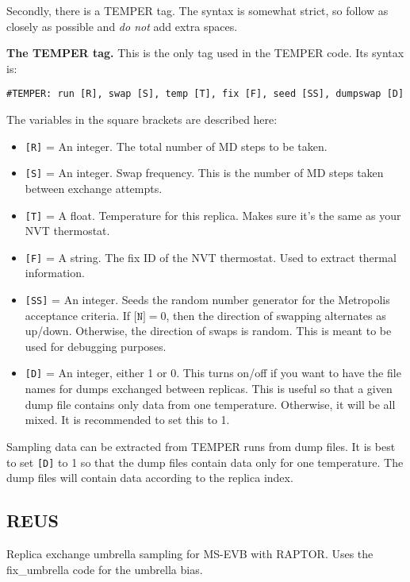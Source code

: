 \documentclass[10pt]{article}
\begin{document}
Secondly, there is a TEMPER tag. The syntax is somewhat strict,
so follow as closely as possible and {\em do not} add extra spaces.

\textbf{The TEMPER tag.} This is the only tag used in the TEMPER code. Its syntax is:
\begin{verbatim}
#TEMPER: run [R], swap [S], temp [T], fix [F], seed [SS], dumpswap [D]
\end{verbatim}
The variables in the square brackets are described here:
\begin{itemize}
\item	\texttt{[R]} = An integer. The total number of MD steps to be taken.
\item	\texttt{[S]} = An integer. Swap frequency. This is the number of MD steps taken between exchange attempts.
\item	\texttt{[T]} = A float. Temperature for this replica. Makes sure it's the same as your NVT thermostat.
\item 	\texttt{[F]} = A string. The fix ID of the NVT thermostat. Used to extract thermal information.
\item	\texttt{[SS]} = An integer. Seeds the random number generator for the Metropolis
		acceptance criteria.
		If $\texttt{[N]} = 0$,
		then the direction of swapping alternates as up/down. Otherwise, the direction of swaps
		is random. This is meant to be used for debugging purposes.
\item	\texttt{[D]} = An integer, either 1 or 0. This turns on/off if you want to have the file names for dumps
		exchanged between replicas. This is useful so that a given dump file contains only data from one temperature.
		Otherwise, it will be all mixed. It is recommended to set this to 1.
\end{itemize}

Sampling data can be extracted from TEMPER runs from dump files. It is best to set \texttt{[D]} to 1 so that
the dump files contain data only for one temperature. The dump files will contain data according to the
replica index.


\subsection{REUS}

Replica exchange umbrella sampling for MS-EVB with RAPTOR. Uses the fix\_umbrella code for the umbrella bias.

\end{document}
